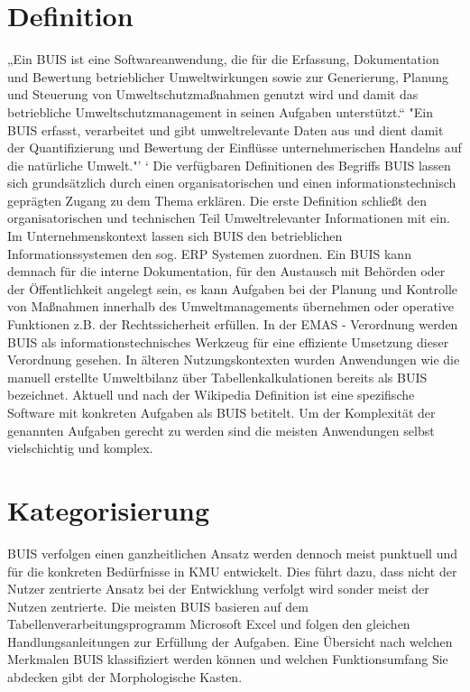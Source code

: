 \documentclass[a4paper, 12pt, twoside, BCOR=20mm, DIV=calc, abstracton, parskip=half*, toc=bibliography, toc=listof, headsepline, footsepline, headings=small, numbers=enddot]{scrreprt}
\begin{document}
	\section{Definition}
	„Ein \ac{BUIS} %
	ist eine Softwareanwendung, die für die Erfassung, Dokumentation und Bewertung betrieblicher Umweltwirkungen sowie  zur Generierung, Planung und Steuerung von Umweltschutzmaßnahmen genutzt wird und damit das betriebliche Umweltschutzmanagement in seinen Aufgaben unterstützt.“ \cite{wohlgemuth2008konzepte}
	"Ein BUIS erfasst, verarbeitet und gibt umweltrelevante Daten aus und dient damit der Quantifizierung und Bewertung der Einflüsse unternehmerischen Handelns auf die natürliche Umwelt."'\cite{Wiki_BUIS} `
	Die verfügbaren Definitionen des Begriffs \ac{BUIS} lassen sich grundsätzlich durch einen
	organisatorischen und einen informationstechnisch geprägten Zugang zu dem Thema erklären. Die erste Definition schließt den organisatorischen und technischen Teil Umweltrelevanter Informationen mit ein. Im Unternehmenskontext lassen sich \ac{BUIS} den betrieblichen Informationssystemen den sog. \ac{ERP} Systemen zuordnen. 
	Ein \ac{BUIS} kann demnach für die interne Dokumentation, für den Austausch mit Behörden oder der Öffentlichkeit angelegt sein, es kann Aufgaben bei der Planung und Kontrolle von Maßnahmen innerhalb	des Umweltmanagements übernehmen oder operative Funktionen z.B. der Rechtssicherheit erfüllen. In der EMAS - Verordnung werden \ac{BUIS} als informationstechnisches Werkzeug für eine effiziente Umsetzung dieser Verordnung gesehen\cite[S. 109ff]{rautenstrauch1999betriebliche}.  
	 In älteren Nutzungskontexten wurden Anwendungen wie die manuell erstellte Umweltbilanz über Tabellenkalkulationen bereits als \ac{BUIS} bezeichnet. Aktuell und nach der Wikipedia Definition ist eine spezifische Software mit konkreten Aufgaben als \ac{BUIS} betitelt. Um der Komplexität der genannten Aufgaben gerecht zu werden sind die meisten Anwendungen selbst vielschichtig und komplex.
	
	\section{Kategorisierung}
	 \ac{BUIS} verfolgen einen ganzheitlichen Ansatz werden dennoch meist punktuell und für die konkreten Bedürfnisse in \ac{KMU} entwickelt. Dies führt dazu, dass nicht der Nutzer zentrierte Ansatz bei der Entwicklung verfolgt wird sonder meist der Nutzen zentrierte. Die meisten \ac{BUIS} basieren auf dem Tabellenverarbeitungsprogramm Microsoft Excel und folgen den gleichen Handlungsanleitungen zur Erfüllung der Aufgaben. 
	Eine Übersicht nach welchen Merkmalen \ac{BUIS} klassifiziert werden können und welchen Funktionsumfang Sie abdecken gibt der Morphologische Kasten.
	
\end{document}
